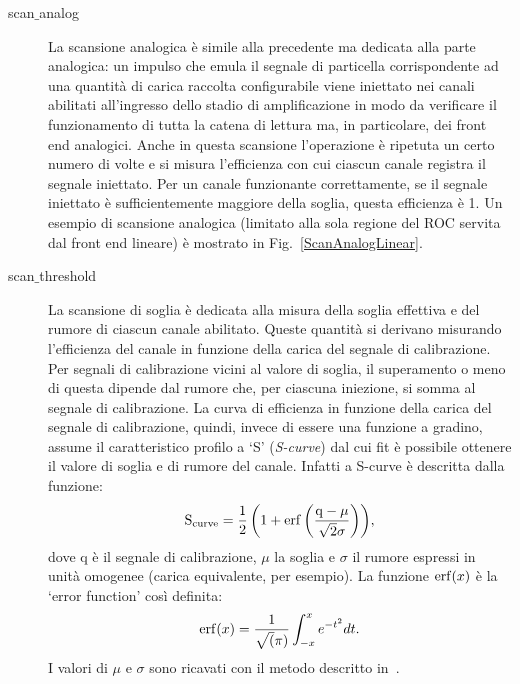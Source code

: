 \begin{description}
\item[scan$\_$analog] La scansione analogica \`e simile alla precedente ma dedicata alla parte analogica: un impulso che emula il segnale di particella corrispondente ad una quantit\`a di carica raccolta configurabile viene iniettato nei canali abilitati all'ingresso dello stadio di amplificazione in modo da verificare il funzionamento di tutta la catena di lettura ma, in particolare, dei front end analogici. Anche in questa scansione l'operazione \`e ripetuta un certo numero di volte e si misura l'efficienza con cui ciascun canale registra il segnale iniettato. Per un canale funzionante correttamente, se il segnale iniettato \`e sufficientemente maggiore della soglia, questa efficienza \`e 1. Un esempio di scansione analogica (limitato alla sola regione del ROC servita dal front end lineare) è mostrato in Fig.~\ref{ScanAnalogLinear}. %

\item[scan$\_$threshold] La scansione di soglia \`e dedicata alla misura della soglia effettiva e del rumore di ciascun canale abilitato. Queste quantit\`a si derivano misurando l'efficienza del canale in funzione della carica del segnale di calibrazione. Per segnali di calibrazione vicini al valore di soglia, il superamento o meno di questa dipende dal rumore che, per ciascuna iniezione, si somma al segnale di calibrazione. La curva di efficienza in funzione della carica del segnale di calibrazione, quindi, invece di essere una funzione a gradino, assume il caratteristico profilo a `S' ({\em S-curve}) dal cui fit \`e possibile ottenere il valore di soglia e di rumore del canale.
Infatti a S-curve è descritta dalla funzione:
\begin{equation}
  \mathrm{S_{curve} = \frac{1}{2} \left( 1 + \operatorname{erf} \left( \frac{q-\mu}{\sqrt{2}\sigma} \right) \right)},
\end{equation}
dove q \`e il segnale di calibrazione, $\mu$ la soglia e $\sigma$ il rumore espressi in unit\`a omogenee (carica equivalente, per esempio). La funzione $\operatorname{erf}(x)$ \`e la `error function' cos\`i definita:
\begin{equation}
 \operatorname{erf}(x) = \frac{1}{\sqrt(\pi)}\int_{-x}^{x} e^{-t^2}dt.
\end{equation}
I valori di $\mu$ e $\sigma$ sono ricavati con il metodo descritto in~\cite{ERF}.


\end{description}
